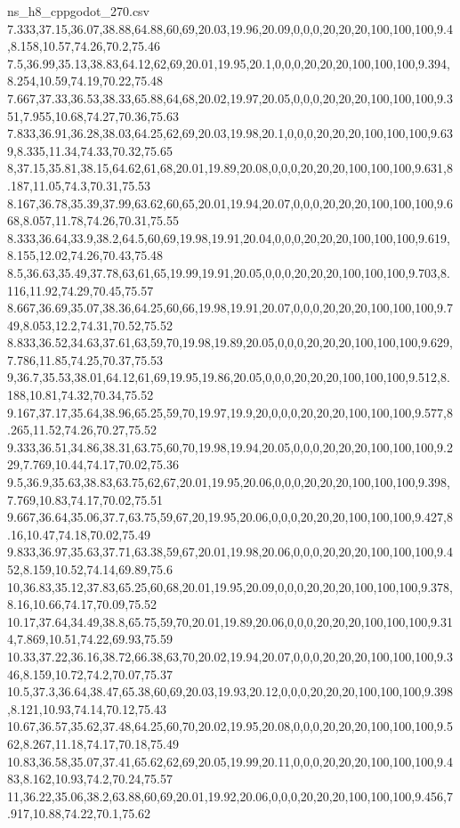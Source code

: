 \begin{filecontents*}[overwrite]{ns_h8_cppgodot_270.csv}
7.333,37.15,36.07,38.88,64.88,60,69,20.03,19.96,20.09,0,0,0,20,20,20,100,100,100,9.4,8.158,10.57,74.26,70.2,75.46
7.5,36.99,35.13,38.83,64.12,62,69,20.01,19.95,20.1,0,0,0,20,20,20,100,100,100,9.394,8.254,10.59,74.19,70.22,75.48
7.667,37.33,36.53,38.33,65.88,64,68,20.02,19.97,20.05,0,0,0,20,20,20,100,100,100,9.351,7.955,10.68,74.27,70.36,75.63
7.833,36.91,36.28,38.03,64.25,62,69,20.03,19.98,20.1,0,0,0,20,20,20,100,100,100,9.639,8.335,11.34,74.33,70.32,75.65
8,37.15,35.81,38.15,64.62,61,68,20.01,19.89,20.08,0,0,0,20,20,20,100,100,100,9.631,8.187,11.05,74.3,70.31,75.53
8.167,36.78,35.39,37.99,63.62,60,65,20.01,19.94,20.07,0,0,0,20,20,20,100,100,100,9.668,8.057,11.78,74.26,70.31,75.55
8.333,36.64,33.9,38.2,64.5,60,69,19.98,19.91,20.04,0,0,0,20,20,20,100,100,100,9.619,8.155,12.02,74.26,70.43,75.48
8.5,36.63,35.49,37.78,63,61,65,19.99,19.91,20.05,0,0,0,20,20,20,100,100,100,9.703,8.116,11.92,74.29,70.45,75.57
8.667,36.69,35.07,38.36,64.25,60,66,19.98,19.91,20.07,0,0,0,20,20,20,100,100,100,9.749,8.053,12.2,74.31,70.52,75.52
8.833,36.52,34.63,37.61,63,59,70,19.98,19.89,20.05,0,0,0,20,20,20,100,100,100,9.629,7.786,11.85,74.25,70.37,75.53
9,36.7,35.53,38.01,64.12,61,69,19.95,19.86,20.05,0,0,0,20,20,20,100,100,100,9.512,8.188,10.81,74.32,70.34,75.52
9.167,37.17,35.64,38.96,65.25,59,70,19.97,19.9,20,0,0,0,20,20,20,100,100,100,9.577,8.265,11.52,74.26,70.27,75.52
9.333,36.51,34.86,38.31,63.75,60,70,19.98,19.94,20.05,0,0,0,20,20,20,100,100,100,9.229,7.769,10.44,74.17,70.02,75.36
9.5,36.9,35.63,38.83,63.75,62,67,20.01,19.95,20.06,0,0,0,20,20,20,100,100,100,9.398,7.769,10.83,74.17,70.02,75.51
9.667,36.64,35.06,37.7,63.75,59,67,20,19.95,20.06,0,0,0,20,20,20,100,100,100,9.427,8.16,10.47,74.18,70.02,75.49
9.833,36.97,35.63,37.71,63.38,59,67,20.01,19.98,20.06,0,0,0,20,20,20,100,100,100,9.452,8.159,10.52,74.14,69.89,75.6
10,36.83,35.12,37.83,65.25,60,68,20.01,19.95,20.09,0,0,0,20,20,20,100,100,100,9.378,8.16,10.66,74.17,70.09,75.52
10.17,37.64,34.49,38.8,65.75,59,70,20.01,19.89,20.06,0,0,0,20,20,20,100,100,100,9.314,7.869,10.51,74.22,69.93,75.59
10.33,37.22,36.16,38.72,66.38,63,70,20.02,19.94,20.07,0,0,0,20,20,20,100,100,100,9.346,8.159,10.72,74.2,70.07,75.37
10.5,37.3,36.64,38.47,65.38,60,69,20.03,19.93,20.12,0,0,0,20,20,20,100,100,100,9.398,8.121,10.93,74.14,70.12,75.43
10.67,36.57,35.62,37.48,64.25,60,70,20.02,19.95,20.08,0,0,0,20,20,20,100,100,100,9.562,8.267,11.18,74.17,70.18,75.49
10.83,36.58,35.07,37.41,65.62,62,69,20.05,19.99,20.11,0,0,0,20,20,20,100,100,100,9.483,8.162,10.93,74.2,70.24,75.57
11,36.22,35.06,38.2,63.88,60,69,20.01,19.92,20.06,0,0,0,20,20,20,100,100,100,9.456,7.917,10.88,74.22,70.1,75.62

\end{filecontents*}
